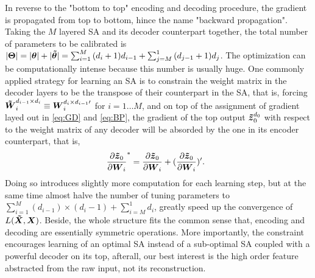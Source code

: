 In reverse to the "bottom to top" encoding and decoding procedure, the gradient is propagated from top to bottom, hince the name "backward propagation". Taking the $M$ layered SA and its decoder counterpart together, the total number of parameters to be calibrated is $|\boldsymbol{\Theta}| = |\boldsymbol{\theta}| + |\boldsymbol{\tilde{\theta}}| = \sum_{i=1}^{M}{(d_i + 1)d_{i-1}} + \sum_{j=M}^{1}{(d_{j-1} + 1)d_j}$. The optimization can be computationally intense because this number is usually huge. One commonly applied strategy for learning an SA is to constrain the weight matrix in the decoder layers to be the transpose of their counterpart in the SA, that is, forcing $\boldsymbol{\tilde{W}}_{i}^{d_{i-1} \times d_{i}} \equiv \boldsymbol{W}_{i}^{d_{i} \times d_{i-1}\prime}$ for $i=1 \ldots M$, and on top of the assignment of gradient layed out in \ref{eq:GD} and \ref{eq:BP}, the gradient of the top output ${\boldsymbol{\tilde{z}}_{0}^{d_{0}}}$ with respect to the weight matrix of any decoder will be absorded by the one in its encoder counterpart, that is, 
\begin{equation*}
  \begin{split}\
    \frac{\partial \boldsymbol{\tilde{z}}_0}{\partial \boldsymbol{W}_i}^* &= \frac{\partial \boldsymbol{\tilde{z}}_0}{\partial \boldsymbol{W}_i} + (\frac{\partial \boldsymbol{\tilde{z}}_0}{\partial \boldsymbol{W}_i})^\prime.
  \end{split}
\end{equation*}
Doing so introduces slightly more computation for each learning step, but at the same time almost halve the number of tuning parameters to $\sum_{i=1}^{M}{(d_{i-1}) \times (d_i - 1)} + \sum_{i=M}^{1}{d_i}$, greatly speed up the convergence of $L(\boldsymbol{\tilde{X}}, \boldsymbol{X})$.  Beside, the whole structure fits the common sense that, encoding and decoding are essentially symmetric operations. More importantly, the constraint encourages learning of an optimal SA instead of a sub-optimal SA coupled with a powerful decoder on its top, afterall, our best interest is the high order feature abstracted from the raw input, not its reconstruction.